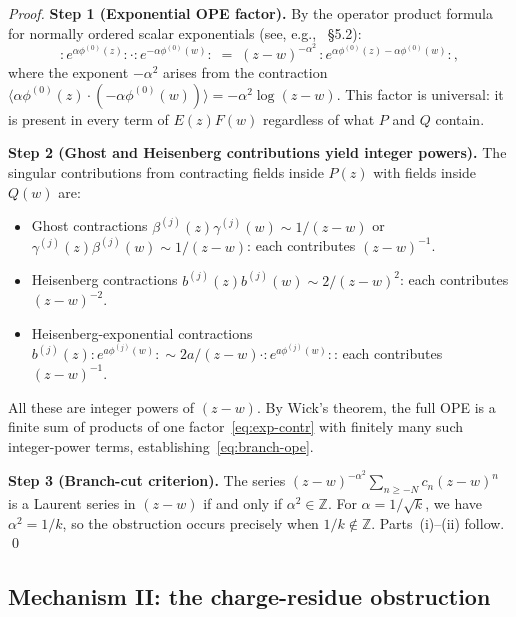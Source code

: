 \documentclass[12pt]{article}
\theoremstyle{plain}
\theoremstyle{definition}
\theoremstyle{remark}
\newcommand{\bl}[1]{\beta^{(#1)}}
\newcommand{\gl}[1]{\gamma^{(#1)}}
\newcommand{\OPE}{\sim}
\newcommand{\no}[1]{:\!#1\!:}
\begin{document}
\begin{proof}
  \textbf{Step 1 (Exponential OPE factor).}
  By the operator product formula for normally ordered scalar exponentials
  (see, e.g., \cite{Frenkel2005}~\S5.2):
  \begin{equation}\label{eq:exp-contr}
    \no{e^{\alpha\phi^{(0)}(z)}}\cdot\no{e^{-\alpha\phi^{(0)}(w)}}
    \;=\;
    (z-w)^{-\alpha^{2}}
    \,\no{e^{\alpha\phi^{(0)}(z)-\alpha\phi^{(0)}(w)}},
  \end{equation}
  where the exponent $-\alpha^{2}$ arises from the contraction
  $\langle\alpha\phi^{(0)}(z)\cdot(-\alpha\phi^{(0)}(w))\rangle = -\alpha^{2}\log(z-w)$.
  This factor is universal: it is present in every term of $E(z)F(w)$
  regardless of what $P$ and $Q$ contain.

  \textbf{Step 2 (Ghost and Heisenberg contributions yield integer powers).}
  The singular contributions from contracting fields inside $P(z)$ with fields
  inside $Q(w)$ are:
  \begin{itemize}
    \item Ghost contractions $\bl{j}(z)\gl{j}(w)\OPE 1/(z-w)$ or
      $\gl{j}(z)\bl{j}(w)\OPE 1/(z-w)$: each contributes $(z-w)^{-1}$.
    \item Heisenberg contractions $b^{(j)}(z)b^{(j)}(w)\OPE 2/(z-w)^{2}$:
      each contributes $(z-w)^{-2}$.
    \item Heisenberg-exponential contractions
      $b^{(j)}(z)\no{e^{a\phi^{(j)}(w)}}\OPE 2a/(z-w)\cdot\no{e^{a\phi^{(j)}(w)}}$:
      each contributes $(z-w)^{-1}$.
  \end{itemize}
  All these are integer powers of $(z-w)$.  By Wick's theorem, the full OPE
  is a finite sum of products of one factor~\eqref{eq:exp-contr} with finitely
  many such integer-power terms, establishing~\eqref{eq:branch-ope}.

  \textbf{Step 3 (Branch-cut criterion).}
  The series $(z-w)^{-\alpha^{2}}\sum_{n\geq -N}c_n(z-w)^n$ is a Laurent
  series in $(z-w)$ if and only if $\alpha^{2}\in\mathbb{Z}$.
  For $\alpha=1/\sqrt{k}$, we have $\alpha^{2}=1/k$, so the obstruction
  occurs precisely when $1/k\notin\mathbb{Z}$.
  Parts~(i)--(ii) follow.
  \qed
\end{proof}

\subsection{Mechanism II: the charge-residue obstruction}
\label{subsec:charge-residue}
\end{document}
